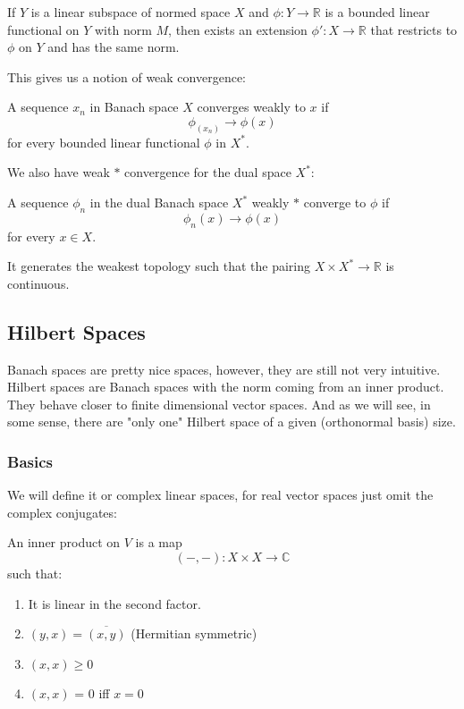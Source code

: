 \documentclass[main.tex]{subfiles}
\begin{document}
\begin{theorem}
If $Y$ is a linear subspace of normed space $X$ and $\phi: Y \rightarrow \mathbb{R}$ is a bounded linear functional on $Y$ with norm $M$, then exists an extension $\phi': X \rightarrow \mathbb{R}$ that restricts to $\phi$ on $Y$ and has the same norm.
\end{theorem}

This gives us a notion of weak convergence:
\begin{definition}
A sequence $x_n$ in Banach space $X$ converges weakly to $x$ if 
$$
\phi_(x_n) \rightarrow \phi(x)
$$
for every bounded linear functional $\phi$ in $X^*$.
\end{definition}

We also have weak $*$ convergence for the dual space $X^*$:
\begin{definition}
A sequence $\phi_n$ in the dual Banach space $X^*$ weakly $*$ converge to $\phi$ if
$$
\phi_n(x) \rightarrow \phi(x)
$$
for every $x \in X$.
\end{definition}
It generates the weakest topology such that the pairing $X \times X^* \rightarrow \mathbb{R}$ is continuous.

\subsection{Hilbert Spaces}
Banach spaces are pretty nice spaces, however, they are still not very intuitive. Hilbert spaces are Banach spaces with the norm coming from an inner product. They behave closer to finite dimensional vector spaces. And as we will see, in some sense, there are "only one" Hilbert space of a given (orthonormal basis) size.


\subsubsection{Basics}
We will define it or complex linear spaces, for real vector spaces just omit the complex conjugates:

\begin{definition}
An inner product on $V$ is a map 
$$
(-, -): X \times X \rightarrow \mathbb{C}
$$
such that:
\begin{enumerate}
    \item It is linear in the second factor.
    \item $(y,x) = \overline{(x,y)}$ (Hermitian symmetric)
    \item $(x,x) \geq 0$
    \item $(x,x)$ = 0 iff $x = 0$
\end{enumerate}
\end{definition}
\end{document}
